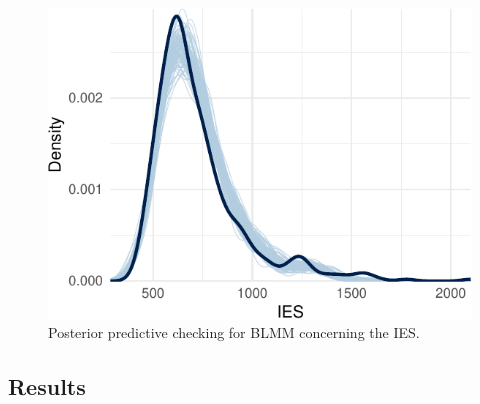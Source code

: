 \documentclass[
  11pt,
  english,
  ,doc,floatsintext]{apa6}
\begin{document}
\begin{figure}[!h]

{\centering \includegraphics[width=\textwidth]{supplementary_materials_files/figure-latex/ppcheckIBMf-1} 

}

\caption{Posterior predictive checking for BLMM concerning the IES.}\label{fig:ppcheckIBMf}
\end{figure}

\newpage

\hypertarget{results-2}{%
\subsection{Results}\label{results-2}}
\end{document}
